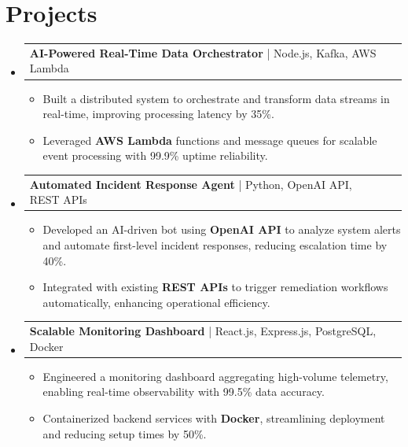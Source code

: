 \documentclass[letterpaper,11pt]{article}
\makeatletter
\newcommand{\resumeItem}[1]{
  \item\footnotesize{
    {#1 \vspace{-2pt}}
  }
}
\newcommand{\resumeProjectHeading}[2]{
    \item
    \begin{tabular*}{1.001\textwidth}{l@{\extracolsep{\fill}}r}
      \small#1 & \textbf{\small #2}\\
    \end{tabular*}\vspace{-7pt}
}
\newcommand{\resumeSubHeadingListStart}{\begin{itemize}[leftmargin=0pt, label={}]}
\newcommand{\resumeSubHeadingListEnd}{\end{itemize}}
\newcommand{\resumeItemListStart}{\begin{itemize}[leftmargin=*]}
\newcommand{\resumeItemListEnd}{\end{itemize}\vspace{-5pt}}
\makeatother
\begin{document}
\section{Projects}
    \vspace{-5pt}
    \resumeSubHeadingListStart
      \resumeProjectHeading
          {\textbf{AI-Powered Real-Time Data Orchestrator} | Node.js, Kafka, AWS Lambda}{}
          \resumeItemListStart
              \resumeItem{Built a distributed system to orchestrate and transform data streams in real-time, improving processing latency by 35\%.}
              \resumeItem{Leveraged \textbf{AWS Lambda} functions and message queues for scalable event processing with 99.9\% uptime reliability.}
          \resumeItemListEnd
          \vspace{-12pt}
      \resumeProjectHeading
          {\textbf{Automated Incident Response Agent} | Python, OpenAI API, REST APIs}{}
          \resumeItemListStart
              \resumeItem{Developed an AI-driven bot using \textbf{OpenAI API} to analyze system alerts and automate first-level incident responses, reducing escalation time by 40\%.}
              \resumeItem{Integrated with existing \textbf{REST APIs} to trigger remediation workflows automatically, enhancing operational efficiency.}
          \resumeItemListEnd
          \vspace{-12pt}
      \resumeProjectHeading
          {\textbf{Scalable Monitoring Dashboard} | React.js, Express.js, PostgreSQL, Docker}{}
          \resumeItemListStart
              \resumeItem{Engineered a monitoring dashboard aggregating high-volume telemetry, enabling real-time observability with 99.5\% data accuracy.}
              \resumeItem{Containerized backend services with \textbf{Docker}, streamlining deployment and reducing setup times by 50\%.}
          \resumeItemListEnd 
    \resumeSubHeadingListEnd
\end{document}
